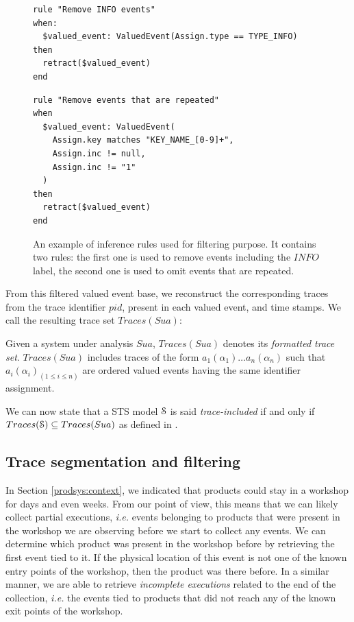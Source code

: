 \begin{figure}[ht]
\begin{framed}
\begin{BVerbatim}
rule "Remove INFO events"
when:
  $valued_event: ValuedEvent(Assign.type == TYPE_INFO)
then
  retract($valued_event)
end
\end{BVerbatim}
\end{framed}

\begin{framed}
\begin{BVerbatim}
rule "Remove events that are repeated"
when
  $valued_event: ValuedEvent(
    Assign.key matches "KEY_NAME_[0-9]+",
    Assign.inc != null,
    Assign.inc != "1"
  )
then
  retract($valued_event)
end
\end{BVerbatim}
\end{framed}

\caption{An example of inference rules used for filtering
purpose. It contains two rules: the first one is used to remove
events including the $INFO$ label, the second one is used to omit
events that are repeated.}
\label{fig:removalrules}
\end{figure}

From this filtered valued event base, we reconstruct the
corresponding traces from the trace identifier $pid$, present in
each valued event, and time stamps. We call the resulting trace
set $Traces(Sua)$:

\begin{definition}
    Given a system under analysis $\mathit{Sua}$, $Traces(Sua)$
    denotes its \emph{formatted trace set}. $Traces(Sua)$
    includes traces of the form $a_1(\alpha_1) \dots
    a_n(\alpha_n)$ such that $a_i(\alpha_i)_{(1 \leq i \leq
    n)}$ are ordered valued events having the same identifier
    assignment.

	\label{def:structuredtrace}
\end{definition}

We can now state that a STS model $\EuScript{S}$ is said
\emph{trace-included} if and only if $Traces(\EuScript{S})
\subseteq Traces(Sua)$ as defined in \cite{petrenko06}.

\subsection{Trace segmentation and filtering}
\label{sec:modelinf:prodsystems:segmentation}

In Section \ref{prodsys:context}, we indicated that products
could stay in a workshop for days and even weeks. From our point
of view, this means that we can likely collect partial
executions, \emph{i.e.} events belonging to products that were present
in the workshop we are observing before we start to collect any
events. We can determine which product was present in the
workshop before by retrieving the first event tied to it.
If the physical location of this event is not one of the known
entry points of the workshop, then the product was there before.
In a similar manner, we are able to retrieve \emph{incomplete
executions} related to the end of the collection, \emph{i.e.} the
events tied to products that did not reach any of the known exit
points of the workshop.

